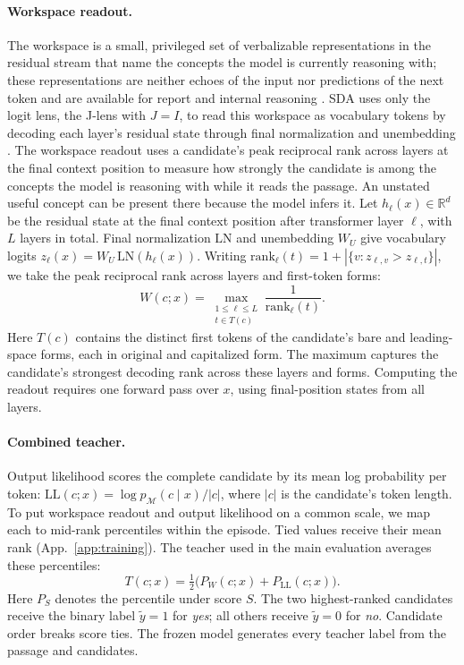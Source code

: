 \paragraph{Workspace readout.}
The workspace is a small, privileged set of verbalizable representations
in the residual stream that name the concepts the model is currently
reasoning with; these representations are neither echoes of the input
nor predictions of the next token and are available for report and
internal reasoning \citep{anthropic2026workspace}.
SDA uses only the logit lens, the J-lens with $J=I$, to read this
workspace as vocabulary tokens by decoding each layer's residual state
through final normalization and unembedding
\citep{nostalgebraist2020logitlens,anthropic2026workspace}.
The workspace readout uses a candidate's peak reciprocal rank across
layers at the final context position to measure how strongly the
candidate is among the concepts the model is reasoning with while it
reads the passage. An unstated useful concept can be present there
because the model infers it.
Let $h_\ell(x)\in\mathbb{R}^d$ be the residual state at the final context
position after transformer layer $\ell$, with $L$ layers in total.
Final normalization $\mathrm{LN}$ and unembedding $W_U$ give vocabulary
logits $z_\ell(x)=W_U\,\mathrm{LN}(h_\ell(x))$.
Writing $\mathrm{rank}_\ell(t)=1+|\{v:z_{\ell,v}>z_{\ell,t}\}|$, we take
the peak reciprocal rank across layers and first-token forms:
\begin{equation}
W(c;x)=\max_{\substack{1\leq\ell\leq L\\ t\in T(c)}}
\frac{1}{\mathrm{rank}_\ell(t)}.
\label{eq:wrr}
\end{equation}
Here $T(c)$ contains the distinct first tokens of the candidate's bare
and leading-space forms, each in original and capitalized form.
The maximum captures the candidate's strongest decoding rank across
these layers and forms. Computing the readout requires one forward pass
over $x$, using final-position states from all layers.

\paragraph{Combined teacher.}
Output likelihood scores the complete candidate by its mean log
probability per token:
$\mathrm{LL}(c;x)=\log p_{\mathcal M}(c\mid x)/|c|$, where $|c|$ is the
candidate's token length. To put workspace readout and output likelihood
on a common scale, we map each to mid-rank percentiles within the
episode. Tied values receive their mean rank
(App.~\ref{app:training}). The teacher used in the main evaluation
averages these percentiles:
\begin{equation}
T(c;x)=\tfrac12\bigl(P_W(c;x)+P_{\mathrm{LL}}(c;x)\bigr).
\label{eq:teacher}
\end{equation}
Here $P_S$ denotes the percentile under score $S$.
The two highest-ranked candidates receive the binary label $\tilde y=1$
for \emph{yes}; all others receive $\tilde y=0$ for \emph{no}.
Candidate order breaks score ties. The frozen model generates every
teacher label from the passage and candidates.

